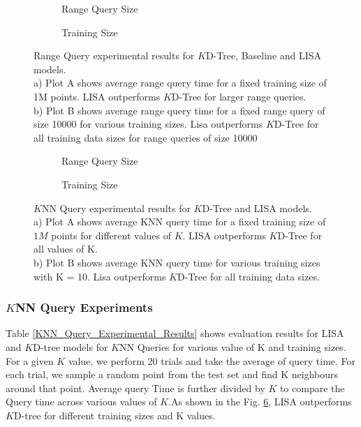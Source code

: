 \begin{figure}
 \centering
     \begin{subfigure}[b]{0.45\textwidth}
         \centering
         
         \caption{Range Query Size}
         \label{fig:2d_exp2_2_1}
     \end{subfigure}
     \hfill
     \begin{subfigure}[b]{0.45\textwidth}
         \centering
         
         \caption{Training Size}
         \label{fig:2d_exp2_2_2}
     \end{subfigure}
     \hfill
     \caption{Range Query experimental results for $K$D-Tree, Baseline and LISA models.\\
     a) Plot A shows average range query time for a fixed training size of 1M points. LISA outperforms $K$D-Tree for larger range queries.\\
     b) Plot B shows average range query time for a fixed range query of size 10000 for various training sizes. Lisa outperforms $K$D-Tree for all training data sizes for range queries of size 10000}
        \label{fig:Range_Query_Comparision}
\end{figure}

\begin{figure}
 \centering
     \begin{subfigure}[h]{0.45\textwidth}
         \centering
         
         \caption{Range Query Size}
         \label{fig:2d_exp2_3_1}
     \end{subfigure}
     \begin{subfigure}[h]{0.45\textwidth}
         \centering
         
         \caption{Training Size}
         \label{fig:2d_exp2_3_2}
     \end{subfigure}
     \caption{$K$NN Query experimental results for $K$D-Tree and LISA models.\\
     a) Plot A shows average KNN query time for a fixed training size of $1M$ points for different values of $K$. LISA outperforms $K$D-Tree for all values of K. \\
     b) Plot B shows average KNN query time for various training sizes with K = 10. Lisa outperforms $K$D-Tree for all training data sizes. }
        \label{fig:KNN_Query_Comparision}
\end{figure}

\subsubsection {$K$NN Query Experiments}
Table \ref{KNN_Query_Experimental_Results} shows evaluation results for LISA and $K$D-tree models for $K$NN Queries for various value of K and training sizes. For a given $K$ value, we perform 20 trials and take the average of query time. For each trial, we sample a random point from the test set and find K neighbours around that point. Average query Time is further divided by $K$ to compare the Query time across various values of $K$.As shown in the Fig. \ref{fig:KNN_Query_Comparision}, LISA outperforms $K$D-tree for different training sizes and K values.


